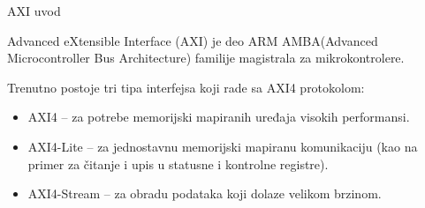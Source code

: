 \documentclass[10pt]{beamer}
\begin{document}
\begin{frame}{AXI uvod}
	
	Advanced eXtensible Interface (AXI) je deo ARM AMBA(Advanced Microcontroller Bus Architecture) familije magistrala za mikrokontrolere.
	
	\bigskip
	
	Trenutno postoje tri tipa interfejsa koji rade sa AXI4 protokolom:

	\begin{itemize}
	
		\item AXI4 – za potrebe memorijski mapiranih uređaja visokih performansi.
		\item AXI4-Lite – za jednostavnu memorijski mapiranu komunikaciju (kao na primer za čitanje i upis u statusne i kontrolne registre).
		\item AXI4-Stream – za obradu podataka koji dolaze velikom brzinom.
		
	\end{itemize}
	
\end{frame}
\end{document}
